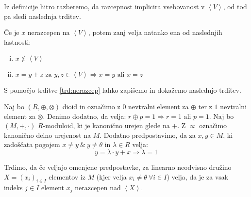\documentclass[mat1]{fmfdelo}
\newcommand{\Gen}[1]{\ensuremath{\left<{#1}\right>}}
\begin{document}
Iz definicije hitro razberemo, da razcepnost implicira vsebovanost v \Gen{V}, od tod pa sledi naslednja trditev.
	
\begin{trditev}
	\label{trd:nerazcep}
	Če je $x$ nerazcepen na \Gen{V}, potem zanj velja natanko ena od naslednjih lastnosti:
	\begin{enumerate}[(i)] 
		\item $x \notin \Gen{V}$
		\item $x = y + z \text{~za~} y, z\in\Gen{V}\Rightarrow x = y \text{~ali~} x = z$
	\end{enumerate}
\end{trditev}

S pomočjo trditve \ref{trd:nerazcep} lahko zapišemo in dokažemo naslednjo trditev.

\begin{trditev}
	\label{trd:potrebzanerazcep}
	Naj bo $(R, \oplus, \otimes)$ dioid in označimo z $0$ nevtralni element za $\oplus$ ter z $1$ nevtralni element za $\otimes$. Denimo dodatno, da velja: $r\oplus p = 1 \Rightarrow r = 1 \text{~ali~} p=1$. 
	Naj bo $(M, +, \cdot)$ $R$-moduloid, ki je kanonično urejen glede na $+$. Z $\varpropto$ označimo kanonično delno urejenost na $M$. Dodatno predpostavimo, da za $x, y\in M$, ki zadoščata pogojem $x \neq y ~\&~ y\neq\theta$ in $\lambda\in R$ velja: $$y = \lambda\cdot y + x \Rightarrow \lambda = 1$$
	
	Trdimo, da če veljajo omenjene predpostavke, za linearno neodvisno družino $X = (x_i)_{i\in I}$ elementov iz $M$ (kjer velja $x_i \neq \theta~\forall i\in I$) velja, da je za vsak indeks $j\in I$ element $x_j$ nerazcepen nad \Gen{X}.
\end{trditev}
\end{document}
